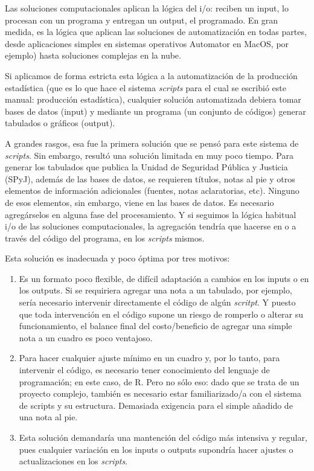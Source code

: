 \documentclass[
  spanish,
]{book}
\begin{document}
Las soluciones computacionales aplican la lógica del i/o: reciben un input, lo procesan con un programa y entregan un output, el programado. En gran medida, es la lógica que aplican las soluciones de automatización en todas partes, desde aplicaciones simples en sistemas operativos Automator en MacOS, por ejemplo) hasta soluciones complejas en la nube.

Si aplicamos de forma estricta esta lógica a la automatización de la producción estadística (que es lo que hace el sistema \emph{scripts} para el cual se escribió este manual: producción estadística), cualquier solución automatizada debiera tomar bases de datos (input) y mediante un programa (un conjunto de códigos) generar tabulados o gráficos (output).

A grandes rasgos, esa fue la primera solución que se pensó para este sistema de \emph{scripts}. Sin embargo, resultó una solución limitada en muy poco tiempo. Para generar los tabulados que publica la Unidad de Seguridad Pública y Justicia (SPyJ), además de las bases de datos, se requieren títulos, notas al pie y otros elementos de información adicionales (fuentes, notas aclaratorias, etc). Ninguno de esos elementos, sin embargo, viene en las bases de datos. Es necesario agregárselos en alguna fase del procesamiento. Y si seguimos la lógica habitual i/o de las soluciones computacionales, la agregación tendría que hacerse en o a través del código del programa, en los \emph{scripts} mismos.

Esta solución es inadecuada y poco óptima por tres motivos:

\begin{enumerate}
\def\labelenumi{\arabic{enumi}.}
\item
  Es un formato poco flexible, de difícil adaptación a cambios en los inputs o en los outputs. Si se requiriera agregar una nota a un tabulado, por ejemplo, sería necesario intervenir directamente el código de algún \emph{scritpt}. Y puesto que toda intervención en el código supone un riesgo de romperlo o alterar su funcionamiento, el balance final del costo/beneficio de agregar una simple nota a un cuadro es poco ventajoso.
\item
  Para hacer cualquier ajuste mínimo en un cuadro y, por lo tanto, para intervenir el código, es necesario tener conocimiento del lenguaje de programación; en este caso, de R. Pero no sólo eso: dado que se trata de un proyecto complejo, también es necesario estar familiarizado/a con el sistema de scripts y su estructura. Demasiada exigencia para el simple añadido de una nota al pie.
\item
  Esta solución demandaría una mantención del código más intensiva y regular, pues cualquier variación en los inputs o outputs supondría hacer ajustes o actualizaciones en los \emph{scripts}.
\end{enumerate}
\end{document}
